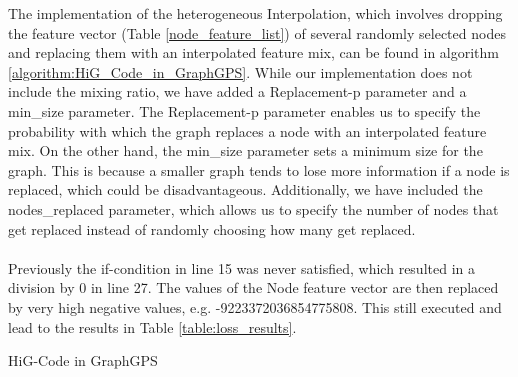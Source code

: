 The implementation of the heterogeneous Interpolation, which involves dropping the feature vector (Table \ref{node_feature_list}) of several randomly selected nodes and replacing them with an interpolated feature mix, can be found in algorithm \ref{algorithm:HiG_Code_in_GraphGPS}. While our implementation does not include the mixing ratio, we have added a Replacement-p parameter and a min\_size parameter. The Replacement-p parameter enables us to specify the probability with which the graph replaces a node with an interpolated feature mix. On the other hand, the min\_size parameter sets a minimum size for the graph. This is because a smaller graph tends to lose more information if a node is replaced, which could be disadvantageous. Additionally, we have included the nodes\_replaced parameter, which allows us to specify the number of nodes that get replaced instead of randomly choosing how many get replaced. \\\\

Previously the if-condition in line 15 was never satisfied, which resulted in a division by 0 in line 27. The values of the Node feature vector are then replaced by very high negative values, e.g. -9223372036854775808. This still executed and lead to the results in Table \ref{table:loss_results}. 

\begin{minipage}{\linewidth}
    \begin{algorithm}[H]
        \DontPrintSemicolon
        
        \caption{HiG-Code in GraphGPS}
        \label{algorithm:HiG_Code_in_GraphGPS}
    \end{algorithm}
\end{minipage}

